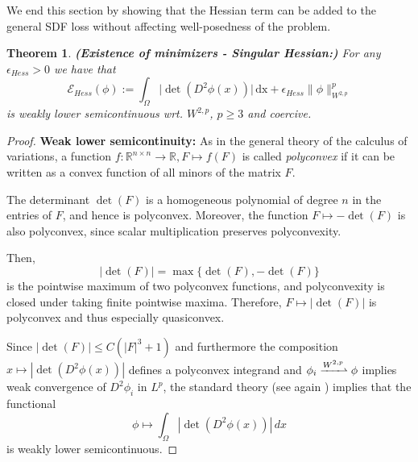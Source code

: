 \documentclass[12pt,openany]{book}
\newcommand{\R}{\mathbb{R}}
\theoremstyle{plainnormal}
\newtheorem{theorem}{Theorem}[section]
\theoremstyle{remark}
\begin{document}
We end this section by showing that the Hessian term can be added to the general SDF loss without affecting well-posedness of the problem.
\begin{theorem}{\textbf{(Existence of minimizers - Singular Hessian:)}}
For any $\epsilon_{Hess} > 0$ we have that $$ \mathcal E_{Hess}(\phi) := \int_\Omega \big|\det(D^2 \phi(x))\big| \,\mathrm{dx} + \epsilon_{Hess} \|\phi\|_{W^{2,p}}^p $$
is weakly lower semicontinuous wrt. $W^{2,p}$, $p\geq 3$ and coercive.
\end{theorem} 
\begin{proof}
    \textbf{Weak lower semicontinuity:} 
    As in the general theory of the calculus of variations, a function \(f: \mathbb{R}^{n \times n} \to \mathbb{R}, F \mapsto f(F)\) is called \emph{polyconvex} if it can be written as a convex function of all minors of the matrix \(F\).

The determinant \(\det(F)\) is a homogeneous polynomial of degree \(n\) in the entries of \(F\), and hence is polyconvex. Moreover, the function \(F \mapsto -\det(F)\) is also polyconvex, since scalar multiplication preserves polyconvexity.

Then,
\[
|\det(F)| = \max\{ \det(F), -\det(F) \}
\]
is the pointwise maximum of two polyconvex functions, and polyconvexity is closed under taking finite pointwise maxima. Therefore, \(F \mapsto |\det(F)|\) is polyconvex and thus especially quasiconvex.

Since \(|\det(F)| \leq C (|F|^3+1)\) and furthermore the composition \(x \mapsto |\det(D^2 \phi(x))|\) defines a polyconvex integrand and \(\phi_i \xrightharpoonup{W^{2,p}} \phi\) implies weak convergence of \(D^2 \phi_i\) in \(L^p\), the standard theory (see again \cite{Dacorogna}) implies that the functional
\[
\phi \mapsto \int_\Omega |\det(D^2 \phi(x))|\, dx
\]
is weakly lower semicontinuous.


\end{proof}
\end{document}
